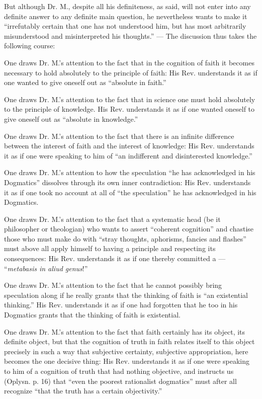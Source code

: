 \documentclass[12pt,a4paper,openany]{book}
\newcommand{\opage}[1]{\marginnote{\footnotesize\textit{[#1]}}}
\begin{document}
But although Dr. M., despite all his definiteness, as
said, will not enter into any definite answer to
any definite main question, he nevertheless wants
to make it ``irrefutably certain that one has not understood him,
but has most arbitrarily misunderstood and misinterpreted his
thoughts.'' --- The discussion thus takes the following course:

One draws Dr. M.'s attention to the fact that in the cognition of faith
it becomes necessary to hold absolutely to the principle
of faith: His Rev. understands it as if one wanted to give oneself out
as ``absolute in faith.''

One draws Dr. M.'s attention to the fact that in science one
must hold absolutely to the principle of knowledge. His Rev.
understands it as if one wanted oneself to give oneself out as ``absolute
in knowledge.''

One draws Dr. M.'s attention to the fact that there is an
infinite difference between the interest of faith and the interest of
knowledge: His Rev. understands it as if one were speaking
to him of ``an indifferent and disinterested knowledge.''

One draws Dr. M.'s attention to how the
speculation ``he has acknowledged in his Dogmatics''
\setcounter{footnote}{0}%
\opage{64}dissolves through its own inner contradiction: His Rev. understands
it as if one took no account at all of ``the speculation''
he has acknowledged in his Dogmatics.

One draws Dr. M.'s attention to the fact that a systematic
head (be it philosopher or theologian) who wants to assert
``coherent cognition'' and chastise those who must
make do with ``stray thoughts, aphorisms, fancies and flashes''
must above all apply himself to having a principle and respecting
its consequences: His Rev. understands it as if
one thereby committed a --- ``\textit{metabasis in aliud genus}!''

One draws Dr. M.'s attention to the fact that he cannot possibly
bring speculation along if he really grants
that the thinking of faith is ``an existential thinking.'' His Rev.
understands it as if one had forgotten that he too in his
Dogmatics grants that the thinking of faith is existential.

One draws Dr. M.'s attention to the fact that faith certainly
has its object, its definite object, but that the cognition of truth
in faith relates itself to this object precisely
in such a way that subjective certainty, subjective appropriation,
here becomes the one decisive thing: His Rev. understands it as
if one were speaking to him of a cognition of truth that
had nothing objective, and instructs us (Oplysn. p. 16) that
``even the poorest rationalist dogmatics'' must after all recognize
``that the truth has a certain objectivity.''
\end{document}
